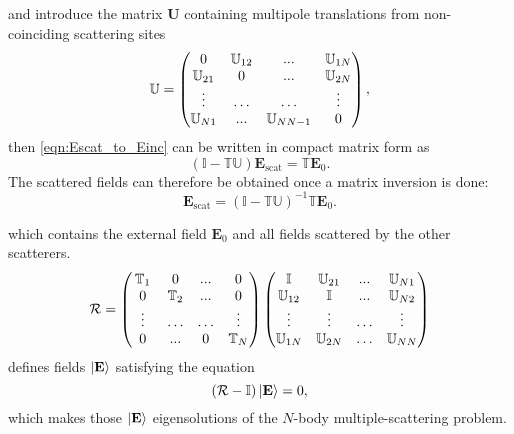 and introduce the matrix $\mathbf{U}$ containing multipole translations from non-coinciding scattering sites
\begin{equation}
\mathbb{U} = 
\left(
\begin{matrix}
0 & \mathbb{U}_{12} & ... & \mathbb{U}_{1 N} \\
\mathbb{U}_{21} & 0 & ... & \mathbb{U}_{2 N} \\
\vdotswithin{\ldots} & \ldots &  \ldots & \vdotswithin{\ldots} \\
\mathbb{U}_{N 1} & ... & \mathbb{U}_{N N-1} & 0\\
\end{matrix}
\right),
\end{equation}
then \cref{eqn:Escat_to_Einc} can be written in compact matrix form as
\begin{equation}
\left(\mathbb{I}-\mathbb{T} \mathbb{U}\right)\mathbf{E}_\mathrm{scat} = 
\mathbb{T} \mathbf{E}_0.
\label{eqn:matrix_form}
\end{equation}
The scattered fields can therefore be obtained once a matrix inversion is done:
\begin{equation}
\mathbf{E}_\mathrm{scat} = \left(\mathbb{I}-\mathbb{T} \mathbb{U}\right)^{-1}
\mathbb{T} \mathbf{E}_0.
\label{eqn:matrix_form}
\end{equation}


which contains the external field $\mathbf{E}_0$ and all fields scattered by the other scatterers.
\begin{equation}
\mathcal{R} = 
\left(
\begin{matrix}
\mathbb{T}_1 & 0 & ... & 0 \\
0 & \mathbb{T}_2 & ... & 0 \\
\vdotswithin{\ldots} & \ldots &  \ldots & \vdotswithin{\ldots} \\
0 & ... & 0 & \mathbb{T}_N\\
\end{matrix}
\right)
\left(\begin{matrix}
\mathbb{I} & \mathbb{U}_{21} & ... & \mathbb{U}_{N 1} \\
\mathbb{U}_{12} & \mathbb{I} & ... & \mathbb{U}_{N 2} \\
\vdotswithin{\mathbb{U}_{13}} & \vdotswithin{\ldots} & \ldots & \vdotswithin{\ldots} \\
\mathbb{U}_{1 N} & \mathbb{U}_{2 N} & \ldots & \mathbb{U}_{N N} 
\end{matrix}\right)
\end{equation}
defines fields $\ket{\mathbf{E}}$ satisfying the equation
\begin{equation}
\left(\mathcal{R}-\mathbb{I}\right)\ket{\mathbf{E}} = 0,
\end{equation}
which makes those $\ket{\mathbf{E}}$ eigensolutions of the $N$-body multiple-scattering problem.